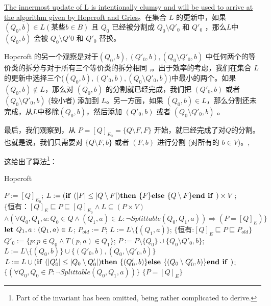 \uline{The innermost update of L is intentionally clumsy and will be used to arrive at the algorithm given by Hopcroft and Gries}。在集合 $L$ 的更新中，如果 $ (Q_0,b) \in L (\mbox{某些}b \in B) $ 且 $Q_0$ 已经被分割成 $ Q_0 \setminus Q'_0 $ 和 $ Q'_0 $ ，那么$L$中 $(Q_0,b)$ 会被 $ Q_0 \setminus Q'0 $ 和 $ Q'_0 $ 替换。

Hopcroft 的另一个观察是对于$ (Q_0,b),(Q'_0,b) ,(Q_0 \setminus Q'_0,b) $ 中任何两个的等价类的拆分与对于所有三个等价类的拆分相同 \cite[pp. 190-191]{Hopc71},\cite[引理 6]{Grie73}。出于效率的考虑，我们在集合 $L$ 的更新中选择三个($ (Q_0,b),(Q'_0,b) ,(Q_0 \setminus Q'_0,b) $)中最小的两个。如果 $(Q_0,b) \not\in L$，那么对 $(Q_0,b)$ 的分割就已经完成，我们把 $ (Q'_0,b) $ 或者  $ (Q_0 \setminus Q'_0,b) $ (较小者) 添加到 $L$。另一方面，如果  $(Q_0,b) \in L$，那么分割还未完成，从$L$中移除$(Q_0,b)$，然后添加 $ (Q'_0,b) $ 或者  $ (Q_0 \setminus Q'_0,b) $ 。

最后，我们观察到，从 $ P= [Q]_{E_0} = \{ Q \setminus F,F \} $ 开始，就已经完成了对$Q$的分割。也就是说，我们只需要对 $ \{ Q \setminus F,b \} $ 或者 $ (F,b) $ 进行分割 (对所有的 $b\in V$)。\cite[pp. 190-191]{Hopc71},\cite[引理 6]{Grie73}

这给出了算法\footnote{Part of the invariant has been omitted, being rather complicated to derive.}：

\begin{algorithm}
    \caption{Hopcroft}\label{al:4-8}
    \small
    \begin{algorithmic}[1]
        \State $P:=[Q]_{E_0}$;
        \State $L:= ( \mbox{\textbf{if }} ( |F| \leq |Q \setminus F | ) \mbox{\textbf{then }} \{F\} \mbox{\textbf{else }} \{ Q \setminus F \} \mbox{\textbf{end if }} ) \times V $;
        \State $\{ \mbox{恒有：} [Q]_E \sqsubseteq P \sqsubseteq [Q]_{E_0} \land L \subseteq (P \times V) $
        \State \quad $ \land (\forall Q_0,Q_1,a:Q_0 \in Q \land (Q_1,a) \in L : \neg Splittable (Q_0,Q_1,a)) \Rightarrow (P=[Q]_E) \} $
            \State $ \mbox{\textbf{let }} Q_1,a:(Q_1,a) \in L $;
            \State $ P_{old} := P $;
            \State $ L := L \setminus \{ (Q_1,a) \} $;
            \State $ \{ \mbox{恒有:} [Q]_E \sqsubseteq P \sqsubseteq P_{old} \} $
                \State $ Q'_0 := \{ p:p \in Q_0 \land T(p,a) \in Q_1 \} $;
                \State $ P:= P \setminus \{ Q_0 \} \cup \{ Q_0 \setminus Q'_0,b \} $;
                       $ L := L \setminus \{ (Q_0,b) \} \cup \{ (Q'_0,b),(Q_0, \setminus Q'_0,b ) \} $
                        \State $L:= L \cup ( \mbox{\textbf{if }} ( |Q'_0| \leq |Q_0 \setminus Q'_0 | ) \mbox{\textbf{then }} \{(Q'_0,b)\} \mbox{\textbf{else }} \{ (Q_0 \setminus Q'_0,b) \} \mbox{\textbf{end if }} ) $;
                    \EndIf
                \EndFor
            \EndFor
            \State $ \{ (\forall Q_0,Q_0 \in P : \neg Splittable(Q_0,Q_1,a)) \} $
        \Until $\{ P = [Q]_E \}$
    \end{algorithmic}
\end{algorithm}


